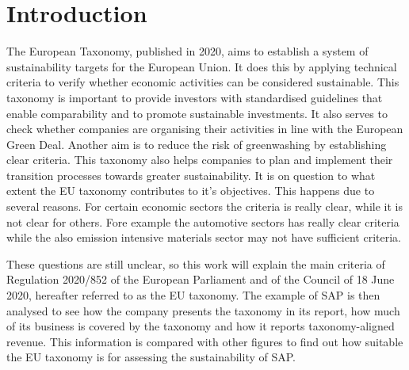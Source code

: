 \chapter{Introduction}
The European Taxonomy, published in 2020, aims to establish a system of sustainability targets for the European Union. It does this by applying technical criteria to verify whether economic activities can be considered sustainable. This taxonomy is important to provide investors with standardised guidelines that enable comparability and to promote sustainable investments. It also serves to check whether companies are organising their activities in line with the European Green Deal. Another aim is to reduce the risk of greenwashing by establishing clear criteria. This taxonomy also helps companies to plan and implement their transition processes towards greater sustainability. It is on question to what extent the EU taxonomy contributes to it's objectives. This happens due to several reasons. For certain economic sectors the criteria is really clear, while it is not clear for others. Fore example the automotive sectors has really clear criteria while the also emission intensive materials sector may not have sufficient criteria.
\autocites[Cf.][1-4]{tax1}[Cf.]{eu_tax_sus}

These questions are still unclear, so this work will explain the main criteria of Regulation 2020/852 of the European Parliament and of the Council of 18 June 2020, hereafter referred to as the EU taxonomy. The example of \ac{SAP} is then analysed to see how the company presents the taxonomy in its report, how much of its business is covered by the taxonomy and how it reports taxonomy-aligned revenue. This information is compared with other figures to find out how suitable the EU taxonomy is for assessing the sustainability of \ac{SAP}.